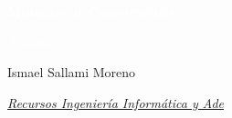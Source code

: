 \documentclass[12pt]{book} %
\begin{document}
\begin{titlepage}
    

    \begin{center}
        \vspace*{2cm}
        
        \vspace{5cm} %
        {\Huge \bfseries\scshape\textcolor{white}{Modelos de
Computación} \par}
        \vspace{0.5cm}
        {\Large \itshape\textcolor{white}{Temario} \par}
        \vspace{0.5cm}


        \vfill
        

        \begin{flushright}
            {Ismael Sallami Moreno \par}
            {\small \itshape \href{https://elblogdeismael.github.io}{Recursos Ingeniería Informática y Ade} \par}
        \end{flushright}
        \vspace{0.3cm}
        
        
    \end{center}
    
    \restoregeometry
\end{titlepage}
\end{document}
